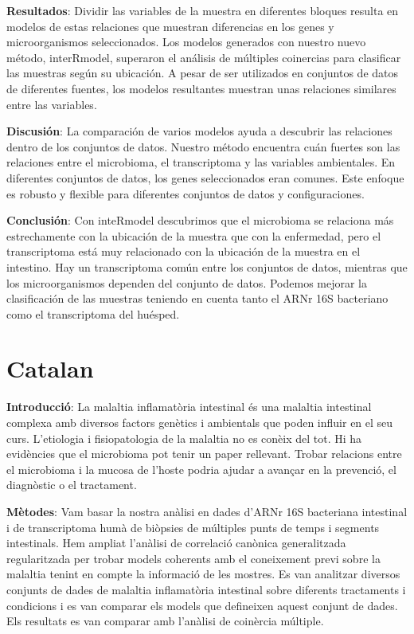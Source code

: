 \documentclass[
  12pt,
  a4paper,
  twoside,
  openright]{book}
\begin{document}
\textbf{Resultados}: Dividir las variables de la muestra en diferentes bloques resulta en modelos de estas relaciones que muestran diferencias en los genes y microorganismos seleccionados.
Los modelos generados con nuestro nuevo método, interRmodel, superaron el análisis de múltiples coinercias para clasificar las muestras según su ubicación.
A pesar de ser utilizados en conjuntos de datos de diferentes fuentes, los modelos resultantes muestran unas relaciones similares entre las variables.

\textbf{Discusión}: La comparación de varios modelos ayuda a descubrir las relaciones dentro de los conjuntos de datos.
Nuestro método encuentra cuán fuertes son las relaciones entre el microbioma, el transcriptoma y las variables ambientales.
En diferentes conjuntos de datos, los genes seleccionados eran comunes.
Este enfoque es robusto y flexible para diferentes conjuntos de datos y configuraciones.

\textbf{Conclusión}: Con inteRmodel descubrimos que el microbioma se relaciona más estrechamente con la ubicación de la muestra que con la enfermedad, pero el transcriptoma está muy relacionado con la ubicación de la muestra en el intestino.
Hay un transcriptoma común entre los conjuntos de datos, mientras que los microorganismos dependen del conjunto de datos.
Podemos mejorar la clasificación de las muestras teniendo en cuenta tanto el ARNr 16S bacteriano como el transcriptoma del huésped.

\hypertarget{catalan}{%
\section*{Catalan}\label{catalan}}

\textbf{Introducció}: La malaltia inflamatòria intestinal és una malaltia intestinal complexa amb diversos factors genètics i ambientals que poden influir en el seu curs.
L'etiologia i fisiopatologia de la malaltia no es conèix del tot.
Hi ha evidències que el microbioma pot tenir un paper rellevant.
Trobar relacions entre el microbioma i la mucosa de l'hoste podria ajudar a avançar en la prevenció, el diagnòstic o el tractament.

\textbf{Mètodes}: Vam basar la nostra anàlisi en dades d'ARNr 16S bacteriana intestinal i de transcriptoma humà de biòpsies de múltiples punts de temps i segments intestinals.
Hem ampliat l'anàlisi de correlació canònica generalitzada regularitzada per trobar models coherents amb el coneixement previ sobre la malaltia tenint en compte la informació de les mostres.
Es van analitzar diversos conjunts de dades de malaltia inflamatòria intestinal sobre diferents tractaments i condicions i es van comparar els models que defineixen aquest conjunt de dades.
Els resultats es van comparar amb l'anàlisi de coinèrcia múltiple.
\end{document}
